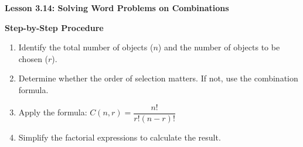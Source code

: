 \begin{center}
\textbf{Lesson 3.14: Solving Word Problems on Combinations}
\end{center}

\vspace*{-1.5ex}

\noindent\textbf{Step-by-Step Procedure}

\begin{enumerate}
    \item Identify the total number of objects (\( n \)) and the number of objects to be chosen (\( r \)).
    \item Determine whether the order of selection matters. If not, use the combination formula.
    \item Apply the formula: \quad   \(C(n, r) = \dfrac{n!}{r!(n-r)!}\)
    \item Simplify the factorial expressions to calculate the result.
\end{enumerate}
